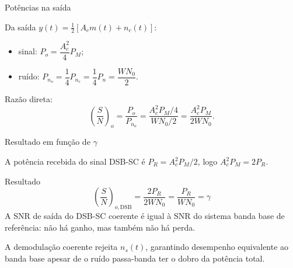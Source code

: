 
\begin{frame}{Potências na saída}

Da saída $y(t) = \frac{1}{2}[A_c m(t) + n_c(t)]$:
\begin{itemize}
\item sinal: $P_o = \dfrac{A_c^2}{4} P_M$;
\item ruído: $P_{n_o} = \dfrac{1}{4} P_{n_c} = \dfrac{1}{4} P_n = \dfrac{W N_0}{2}$.
\end{itemize}

\vspace{0.2cm}

Razão direta:
\[
\left(\frac{S}{N}\right)_o = \frac{P_o}{P_{n_o}} = \frac{A_c^2 P_M / 4}{W N_0 / 2} = \frac{A_c^2 P_M}{2 W N_0}.
\]

\end{frame}


\begin{frame}{Resultado em função de $\gamma$}

A potência recebida do sinal DSB-SC é $P_R = A_c^2 P_M / 2$, logo $A_c^2 P_M = 2 P_R$.

\begin{block}{Resultado}
\[
\left(\frac{S}{N}\right)_{o,\text{DSB}} = \frac{2 P_R}{2 W N_0} = \frac{P_R}{W N_0} = \gamma
\]
A SNR de saída do DSB-SC coerente é igual à SNR do sistema banda base de referência: não há ganho, mas também não há perda.
\end{block}

\vspace{0.2cm}

A demodulação coerente rejeita $n_s(t)$, garantindo desempenho equivalente ao banda base apesar de o ruído passa-banda ter o dobro da potência total.

\end{frame}


